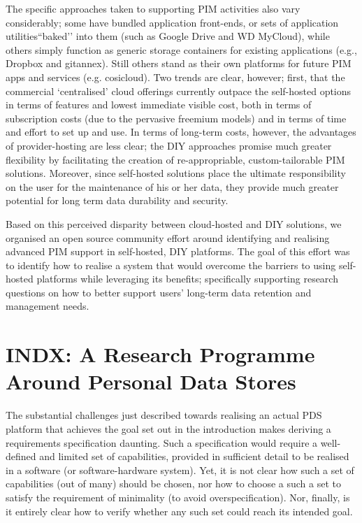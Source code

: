 \documentclass[graybox]{svmult}
\begin{document}
The specific approaches taken to supporting PIM activities also vary considerably; some have bundled application front-ends, or sets of application utilities``baked’’ into them (such as Google Drive and WD MyCloud), while others simply function as generic storage containers for existing applications (e.g., Dropbox and gitannex).  Still others stand  as their own platforms for future PIM apps and services (e.g. cosicloud).  Two trends are clear, however; first, that the commercial ‘centralised’ cloud offerings currently outpace the self-hosted options in terms of features and lowest immediate visible cost, both in terms of subscription costs (due to the pervasive freemium models) and in terms of time and effort to set up and use.  In terms of long-term costs, however, the advantages of provider-hosting are less clear; the DIY approaches promise much greater flexibility by facilitating the creation of re-appropriable, custom-tailorable PIM solutions.  Moreover, since self-hosted solutions place the ultimate responsibility on the user for the maintenance of his or her data, they provide much greater potential for long term data durability and security.  

Based on this perceived disparity between cloud-hosted and DIY solutions, we organised an open source community effort around identifying and realising advanced PIM support in self-hosted, DIY platforms.  The goal of this effort was to identify how to realise a system that would overcome the barriers to using self-hosted platforms while leveraging its benefits; specifically supporting research questions on how to better support users’ long-term data retention and management needs.

\section{INDX: A Research Programme Around Personal Data Stores}

The substantial challenges just described towards realising an actual PDS platform that achieves the goal set out in the introduction makes deriving a requirements specification daunting.  Such a specification would require a well-defined and limited set of capabilities, provided in sufficient detail to be realised in a software (or software-hardware system).  Yet, it is not clear how such a set of capabilities (out of many) should be chosen, nor how to choose a such a set to satisfy the requirement of minimality (to avoid overspecification).  Nor, finally, is it entirely clear how to verify whether any such set could reach its intended goal.
\end{document}

